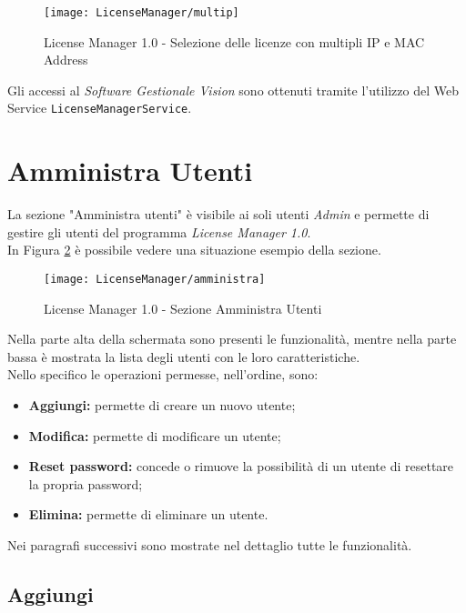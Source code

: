 \begin{figure}[!h] 
    \centering 
    \texttt{[image: LicenseManager/multip]} 
    \caption{License Manager 1.0 - Selezione delle licenze con multipli IP e MAC Address}
\label{multip}

\end{figure}

Gli accessi al \textit{Software Gestionale Vision} sono ottenuti tramite l'utilizzo del Web Service \texttt{LicenseManagerService}.


\section{Amministra Utenti}

La sezione "Amministra utenti" è visibile ai soli utenti \textit{Admin} e permette di gestire gli utenti del programma \textit{License Manager 1.0}.\\
In Figura \ref{amm} è possibile vedere una situazione esempio della sezione.
\begin{figure}[!h] 
    \centering 
    \texttt{[image: LicenseManager/amministra]} 
    \caption{License Manager 1.0 - Sezione Amministra Utenti}
\label{amm}

\end{figure}

Nella parte alta della schermata sono presenti le funzionalità, mentre nella parte bassa è mostrata la lista degli utenti con le loro caratteristiche.\\
Nello specifico le operazioni permesse, nell'ordine, sono:
\begin{itemize}
\item \textbf{Aggiungi:} permette di creare un nuovo utente;
\item \textbf{Modifica:} permette di modificare un utente;
\item \textbf{Reset password:} concede o rimuove la possibilità di un utente di resettare la propria password;
\item \textbf{Elimina:} permette di eliminare un utente.
\end{itemize}

Nei paragrafi successivi sono mostrate nel dettaglio tutte le funzionalità. 

\subsection{Aggiungi}


